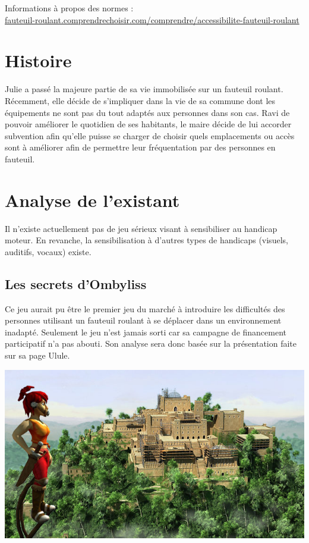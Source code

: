 \documentclass[a4paper,11pt]{article}
\begin{document}
Informations à propos des normes :\\\href{http://fauteuil-roulant.comprendrechoisir.com/comprendre/accessibilite-fauteuil-roulant}{fauteuil-roulant.comprendrechoisir.com/comprendre/accessibilite-fauteuil-roulant}

\section{Histoire}
Julie a passé la majeure partie de sa vie immobilisée sur un fauteuil roulant. Récemment, elle décide de s’impliquer dans la vie de sa commune dont les équipements ne sont pas du tout adaptés aux personnes dans son cas. Ravi de pouvoir améliorer le quotidien de ses habitants, le maire décide de lui accorder subvention afin qu’elle puisse se charger de choisir quels emplacements ou accès sont à améliorer afin de permettre leur fréquentation par des personnes en fauteuil.

\section{Analyse de l'existant}

Il n’existe actuellement pas de jeu sérieux visant à sensibiliser au handicap moteur. En revanche, la sensibilisation à d’autres types de handicaps (visuels, auditifs, vocaux) existe.

\subsection{Les secrets d'Ombyliss}

Ce jeu aurait pu être le premier jeu du marché à introduire les difficultés des personnes utilisant un fauteuil roulant à se déplacer dans un environnement inadapté. Seulement le jeu n’est jamais sorti car sa campagne de financement participatif n’a pas abouti. Son analyse sera donc basée sur la présentation faite sur sa page Ulule.

\begin{center}
\includegraphics[scale=0.45]{./fig/jeu1.png}
\end{center}
\end{document}
